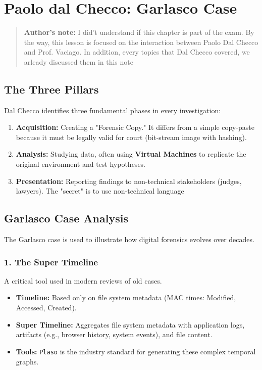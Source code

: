 \section{Paolo dal Checco: Garlasco Case}

\begin{quotation}
    \textbf{Author's note:} I did't understand if this chapter is part of the exam. By the way, this lesson is focused on the interaction between Paolo Dal Checco and Prof. Vaciago.
    In addition, every topics that Dal Checco covered, we arleady discussed them in this note
\end{quotation}

\subsection{The Three Pillars}
Dal Checco identifies three fundamental phases in every investigation:
\begin{enumerate}
    \item \textbf{Acquisition:} Creating a "Forensic Copy." It differs from a simple copy-paste because it must be legally valid for court (bit-stream image with hashing).
    \item \textbf{Analysis:} Studying data, often using \textbf{Virtual Machines} to replicate the original environment and test hypotheses.
    \item \textbf{Presentation:} Reporting findings to non-technical stakeholders (judges, lawyers). The "secret" is to use non-technical language
\end{enumerate}


\subsection{Garlasco Case Analysis}
The Garlasco case is used to illustrate how digital forensics evolves over decades.

\subsubsection*{1. The Super Timeline}
A critical tool used in modern reviews of old cases.
\begin{itemize}
    \item \textbf{Timeline:} Based only on file system metadata (MAC times: Modified, Accessed, Created).
    \item \textbf{Super Timeline:} Aggregates file system metadata with application logs, artifacts (e.g., browser history, system events), and file content. 
    \item \textbf{Tools:} \texttt{Plaso} is the industry standard for generating these complex temporal graphs.
\end{itemize}

